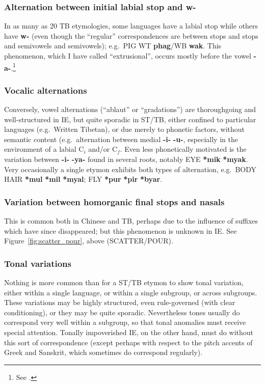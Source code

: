 \subsubsection{Alternation between initial labial stop and w-}
In as many as 20 TB etymologies, some languages have a labial stop while others have \textbf{w-} (even though the “regular” correspondences are between  stops and stops and semivowels and semivowels); e.g.\ PIG WT \textbf{phag}/WB \textbf{wak}. This phenomenon, which I have called “extrusional”, occurs mostly before the vowel \textbf{-a-}.\footnote{See \citealt{JAM-EAPW}.}

\subsubsection{Vocalic alternations}
Conversely, vowel alternations (“ablaut” or “gradations”) are thoroughgoing and well-structured in IE, but quite sporadic in ST/TB, either confined to particular languages (e.g.\ Written Tibetan), or due merely to phonetic factors, without semantic content (e.g.\ alternation between medial \textbf{-i-}  \textbf{-u-}, especially in the environment of a labial $\textrm{C}_i$ and/or $\textrm{C}_f$. Even less phonetically motivated is the variation between \textbf{-i-}  \textbf{-ya-} found in several roots, notably EYE \textbf{*mik}   \textbf{*myak}. Very occasionally a single etymon exhibits both types of alternation, e.g.\ BODY HAIR \textbf{*mul}  \textbf{*mil}   \textbf{*myal}; FLY \textbf{*pur}  \textbf{*pir}  \textbf{*byar}.

\subsubsection{Variation between homorganic final stops and nasals}
This is common both in Chinese and TB, perhaps due to the influence of suffixes which have since disappeared; but this phenomenon is unknown in IE. See Figure~\ref{fig:scatter_pour}, above (SCATTER/POUR).

\subsubsection{Tonal variations}
Nothing is more common than for a ST/TB etymon to show tonal variation, either within a single language, or within a single subgroup, or across subgroups. These variations may be highly structured, even rule-governed (with clear conditioning), or they may be quite sporadic. Nevertheless tones usually do correspond very well within a subgroup, so that tonal anomalies must receive special attention. Tonally impoverished IE, on the other hand, must do without this sort of correspondence (except perhaps with respect to the pitch accents of Greek and Sanskrit, which sometimes do correspond regularly).


